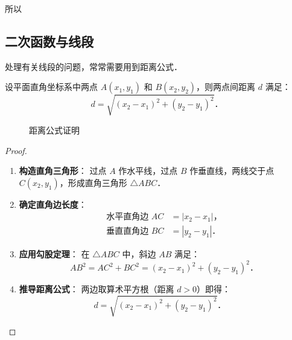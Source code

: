 所以







\subsection{二次函数与\textbf{线段}}

处理有关线段的问题，常常需要用到距离公式．

\begin{theorem}
设平面直角坐标系中两点 \( A(x_1,y_1) \) 和 \( B(x_2,y_2) \)，则两点间距离 \( d \) 满足：
\[
d = \sqrt{(x_2 - x_1)^2 + (y_2 - y_1)^2}．
\]
\end{theorem}


\begin{figure}
    \caption{距离公式证明}
\end{figure}
\begin{proof}



\begin{enumerate}
\item \textbf{构造直角三角形}：
过点 \( A \) 作水平线，过点 \( B \) 作垂直线，两线交于点 \( C(x_2,y_1) \)，形成直角三角形 \( \triangle ABC \)．

\item \textbf{确定直角边长度}：
\begin{align*}
\text{水平直角边 } AC &= |x_2 - x_1|，\\
\text{垂直直角边 } BC &= |y_2 - y_1|．
\end{align*}

\item \textbf{应用勾股定理}：
在 \( \triangle ABC \) 中，斜边 \( AB \) 满足：
\[
AB^2 = AC^2 + BC^2 = (x_2 - x_1)^2 + (y_2 - y_1)^2．
\]

\item \textbf{推导距离公式}：
两边取算术平方根（距离 \( d > 0 \)）即得：
\[
d = \sqrt{(x_2 - x_1)^2 + (y_2 - y_1)^2}．\quad
\]
\end{enumerate}
\end{proof}
